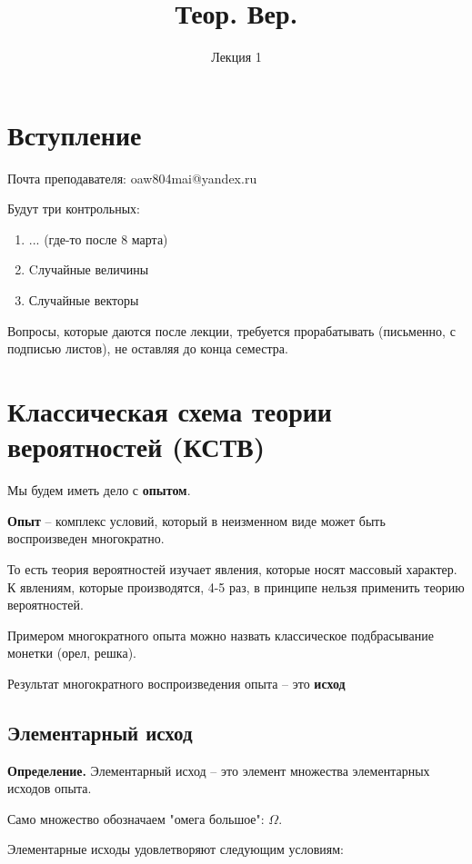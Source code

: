 \documentclass{article}
\title{Теор. Вер.}
\author{Лекция 1}
\begin{document}
\maketitle

\section{Вступление}

Почта преподавателя: oaw804mai@yandex.ru

Будут три контрольных:

\begin{enumerate}
\item ... (где-то после 8 марта)
\item Cлучайные величины
\item Случайные векторы
\end{enumerate}

Вопросы, которые даются после лекции, требуется прорабатывать (письменно, с подписью листов), не оставляя до конца семестра.

\section{Классическая схема теории вероятностей (КСТВ)}

Мы будем иметь дело с \textbf{опытом}.

\textbf{Опыт} -- комплекс условий, который в неизменном виде может быть воспроизведен многократно.

То есть теория вероятностей изучает явления, которые носят массовый характер. К явлениям, которые производятся, 4-5 раз, в принципе нельзя применить теорию вероятностей.

Примером многократного опыта можно назвать классическое подбрасывание монетки (орел, решка). 

Результат многократного воспроизведения опыта -- это \textbf{исход}

\subsection{Элементарный исход}
\textbf{Определение.} Элементарный исход -- это элемент множества элементарных исходов опыта.

Само множество обозначаем "омега большое": $\Omega$.

Элементарные исходы удовлетворяют следующим условиям:
\end{document}
